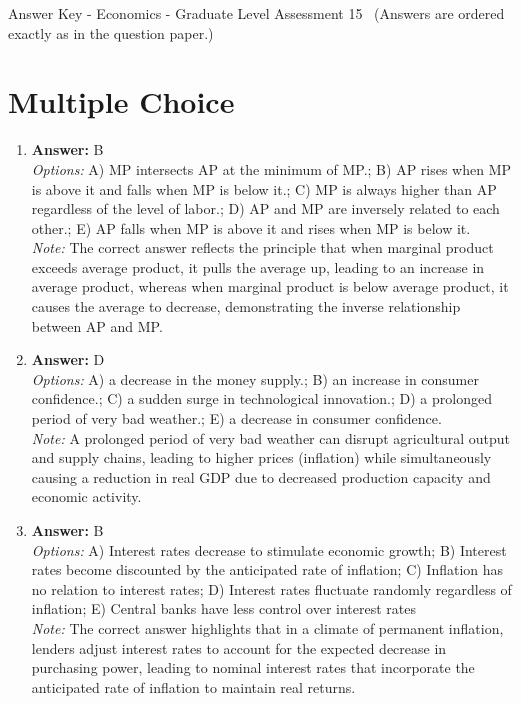 \documentclass[12pt]{article}
\begin{document}
\begin{center}
Answer Key - Economics - Graduate Level Assessment 15 \
\small (Answers are ordered exactly as in the question paper.)
\end{center}

\section*{Multiple Choice}
\begin{enumerate}[label=\arabic*.]
\item \textbf{Answer:} B
\\ \textit{Options:} A) MP intersects AP at the minimum of MP.; B) AP rises when MP is above it and falls when MP is below it.; C) MP is always higher than AP regardless of the level of labor.; D) AP and MP are inversely related to each other.; E) AP falls when MP is above it and rises when MP is below it.
\\ \textit{Note:} The correct answer reflects the principle that when marginal product exceeds average product, it pulls the average up, leading to an increase in average product, whereas when marginal product is below average product, it causes the average to decrease, demonstrating the inverse relationship between AP and MP.
\item \textbf{Answer:} D
\\ \textit{Options:} A) a decrease in the money supply.; B) an increase in consumer confidence.; C) a sudden surge in technological innovation.; D) a prolonged period of very bad weather.; E) a decrease in consumer confidence.
\\ \textit{Note:} A prolonged period of very bad weather can disrupt agricultural output and supply chains, leading to higher prices (inflation) while simultaneously causing a reduction in real GDP due to decreased production capacity and economic activity.
\item \textbf{Answer:} B
\\ \textit{Options:} A) Interest rates decrease to stimulate economic growth; B) Interest rates become discounted by the anticipated rate of inflation; C) Inflation has no relation to interest rates; D) Interest rates fluctuate randomly regardless of inflation; E) Central banks have less control over interest rates
\\ \textit{Note:} The correct answer highlights that in a climate of permanent inflation, lenders adjust interest rates to account for the expected decrease in purchasing power, leading to nominal interest rates that incorporate the anticipated rate of inflation to maintain real returns.

\end{enumerate}
\end{document}
